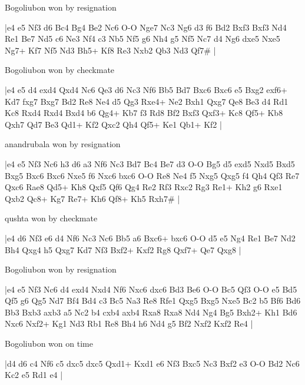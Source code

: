 \showboard

Bogoliubon won by resignation

\makegametitle
|e4 e5 Nf3 d6 Bc4 Bg4 Be2 Nc6 O-O Nge7 Nc3 Ng6 d3 f6 Bd2 Bxf3 Bxf3 Nd4 Re1 Be7 Nd5 c6 Ne3 Nf4 c3 Nb5 Nf5 g6 Nh4 g5 Nf5 Nc7 d4 Ng6 dxe5 Nxe5 Ng7+ Kf7 Nf5 Nd3 Bh5+ Kf8 Re3 Nxb2 Qb3 Nd3 Qf7\#  |

\showboard

Bogoliubon won by checkmate

\makegametitle
|e4 e5 d4 exd4 Qxd4 Nc6 Qe3 d6 Nc3 Nf6 Bb5 Bd7 Bxc6 Bxc6 e5 Bxg2 exf6+ Kd7 fxg7 Bxg7 Bd2 Re8 Ne4 d5 Qg3 Rxe4+ Ne2 Bxh1 Qxg7 Qe8 Be3 d4 Rd1 Kc8 Rxd4 Rxd4 Bxd4 b6 Qg4+ Kb7 f3 Rd8 Bf2 Bxf3 Qxf3+ Kc8 Qf5+ Kb8 Qxh7 Qd7 Be3 Qd1+ Kf2 Qxc2 Qh4 Qf5+ Ke1 Qb1+ Kf2  |

\showboard

anandrubala won by resignation

\makegametitle
|e4 e5 Nf3 Nc6 h3 d6 a3 Nf6 Nc3 Bd7 Bc4 Be7 d3 O-O Bg5 d5 exd5 Nxd5 Bxd5 Bxg5 Bxc6 Bxc6 Nxe5 f6 Nxc6 bxc6 O-O Re8 Ne4 f5 Nxg5 Qxg5 f4 Qh4 Qf3 Re7 Qxc6 Rae8 Qd5+ Kh8 Qxf5 Qf6 Qg4 Re2 Rf3 Rxc2 Rg3 Re1+ Kh2 g6 Rxe1 Qxb2 Qc8+ Kg7 Re7+ Kh6 Qf8+ Kh5 Rxh7\#  |

\showboard

qushta won by checkmate

\makegametitle
|e4 d6 Nf3 e6 d4 Nf6 Nc3 Nc6 Bb5 a6 Bxc6+ bxc6 O-O d5 e5 Ng4 Re1 Be7 Nd2 Bh4 Qxg4 h5 Qxg7 Kd7 Nf3 Bxf2+ Kxf2 Rg8 Qxf7+ Qe7 Qxg8  |

\showboard

Bogoliubon won by resignation

\makegametitle
|e4 e5 Nf3 Nc6 d4 exd4 Nxd4 Nf6 Nxc6 dxc6 Bd3 Be6 O-O Bc5 Qf3 O-O e5 Bd5 Qf5 g6 Qg5 Nd7 Bf4 Bd4 c3 Bc5 Na3 Re8 Rfe1 Qxg5 Bxg5 Nxe5 Bc2 b5 Bf6 Bd6 Bb3 Bxb3 axb3 a5 Nc2 b4 cxb4 axb4 Rxa8 Rxa8 Nd4 Ng4 Bg5 Bxh2+ Kh1 Bd6 Nxc6 Nxf2+ Kg1 Nd3 Rb1 Re8 Bh4 h6 Nd4 g5 Bf2 Nxf2 Kxf2 Re4  |

\showboard

Bogoliubon won on time

\makegametitle
|d4 d6 c4 Nf6 c5 dxc5 dxc5 Qxd1+ Kxd1 e6 Nf3 Bxc5 Nc3 Bxf2 e3 O-O Bd2 Nc6 Kc2 e5 Rd1 e4  |

